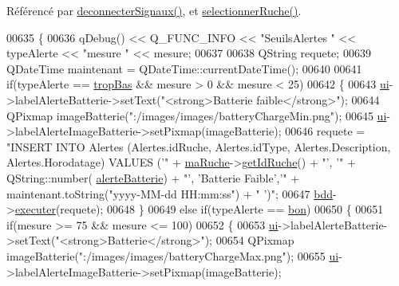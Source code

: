 Référencé par \hyperlink{class_ruche_ihm_a348a76106f3072dd31a382c6025b8113}{deconnecter\+Signaux()}, et \hyperlink{class_ruche_ihm_a7324ae6ea574ccdad47783f466933157}{selectionner\+Ruche()}.


\begin{DoxyCode}
00635 \{
00636     qDebug() << Q\_FUNC\_INFO << \textcolor{stringliteral}{"SeuilsAlertes "} << typeAlerte << \textcolor{stringliteral}{"mesure "} << mesure;
00637 
00638     QString requete;
00639     QDateTime maintenant = QDateTime::currentDateTime();
00640 
00641     \textcolor{keywordflow}{if}(typeAlerte == \hyperlink{parametres_8h_aaa6de8207c94675264c90b10b613368da4257e2f8921856770c8266f55c937295}{tropBas} && mesure > 0 && mesure < 25)
00642     \{
00643         \hyperlink{class_ruche_ihm_a64786058bd7f88ca2f1e9743bb27c25b}{ui}->labelAlerteBatterie->setText(\textcolor{stringliteral}{"<strong>Batterie faible</strong>"});
00644         QPixmap imageBatterie(\textcolor{stringliteral}{":/images/images/batteryChargeMin.png"});
00645         \hyperlink{class_ruche_ihm_a64786058bd7f88ca2f1e9743bb27c25b}{ui}->labelAlerteImageBatterie->setPixmap(imageBatterie);
00646         requete = \textcolor{stringliteral}{"INSERT INTO Alertes (Alertes.idRuche, Alertes.idType, Alertes.Description,
       Alertes.Horodatage) VALUES ('"} + \hyperlink{class_ruche_ihm_a43a6b1fa31f4fba58d919daae3707b38}{maRuche}->\hyperlink{class_ruche_a9f2de5ef29557ec7a53d5e22df34d164}{getIdRuche}() + \textcolor{stringliteral}{"', '"} + QString::number(
      \hyperlink{parametres_8h_a83a725fd153179a2bd97afcc8307737ba11c71364df2afd149875ebfe0238ef7e}{alerteBatterie}) + \textcolor{stringliteral}{"', 'Batterie Faible','"} + maintenant.toString(\textcolor{stringliteral}{"yyyy-MM-dd  HH:mm:ss"}) + \textcolor{stringliteral}{"
      ')"};
00647         \hyperlink{class_ruche_ihm_a0851936fe212e8d40538264f09749153}{bdd}->\hyperlink{class_base_de_donnees_aa8de5f8f8bb17edc43f5c0ee33712081}{executer}(requete);
00648     \}
00649     \textcolor{keywordflow}{else} \textcolor{keywordflow}{if}(typeAlerte == \hyperlink{parametres_8h_aaa6de8207c94675264c90b10b613368da5ac8ec3b54d90a07c6bb5a77ef971821}{bon})
00650     \{
00651         \textcolor{keywordflow}{if}(mesure >= 75 && mesure <= 100)
00652         \{
00653             \hyperlink{class_ruche_ihm_a64786058bd7f88ca2f1e9743bb27c25b}{ui}->labelAlerteBatterie->setText(\textcolor{stringliteral}{"<strong>Batterie</strong>"});
00654             QPixmap imageBatterie(\textcolor{stringliteral}{":/images/images/batteryChargeMax.png"});
00655             \hyperlink{class_ruche_ihm_a64786058bd7f88ca2f1e9743bb27c25b}{ui}->labelAlerteImageBatterie->setPixmap(imageBatterie);

\end{DoxyCode}
